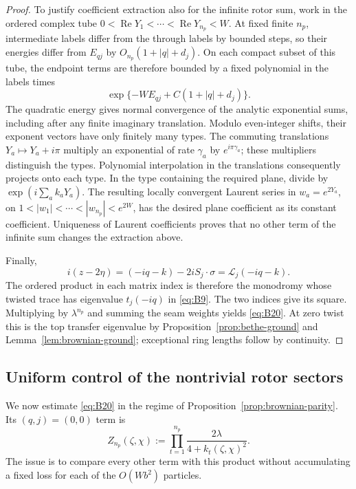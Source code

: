 \begin{proof}
To justify coefficient extraction also for the infinite rotor sum,
work in the ordered complex tube
$0<\operatorname{Re}Y_1<\cdots<\operatorname{Re}Y_{n_p}<W$.
At fixed finite $n_p$, intermediate labels differ from the through
labels by bounded steps, so their energies differ from $E_{qj}$ by
$O_{n_p}(1+|q|+d_j)$.  On each compact subset of this tube, the
endpoint terms are therefore bounded by a fixed polynomial in the
labels times
\[
 \exp\{-WE_{qj}+C(1+|q|+d_j)\}.
\]
The quadratic energy gives normal convergence of the analytic
exponential sums, including after any finite imaginary translation.
Modulo even-integer shifts, their exponent vectors have only finitely
many types.  The commuting translations $Y_a\mapsto Y_a+i\pi$
multiply an exponential of rate $\gamma_a$ by $e^{i\pi\gamma_a}$;
these multipliers distinguish the types.  Polynomial interpolation in
the translations consequently projects onto each type.  In the type
containing the required plane, divide by $\exp(i\sum_a k_aY_a)$.
The resulting locally convergent Laurent series in $w_a=e^{2Y_a}$,
on $1<|w_1|<\cdots<|w_{n_p}|<e^{2W}$, has the desired plane
coefficient as its constant coefficient.  Uniqueness
of Laurent coefficients proves that no other term of the infinite
sum changes the extraction above.

Finally,
\[
 i(z-2\eta)=(-iq-k)-2iS_j\cdot\sigma
           =\mathcal L_j(-iq-k).
\]
The ordered product in each matrix index is therefore the monodromy
whose twisted trace has eigenvalue $t_j(-iq)$ in \eqref{eq:B9}.
The two indices give its square.  Multiplying by $\lambda^{n_p}$ and
summing the seam weights yields \eqref{eq:B20}.  At zero twist this is
the top transfer eigenvalue by Proposition~\ref{prop:bethe-ground} and
Lemma~\ref{lem:brownian-ground}; exceptional ring lengths follow by
continuity.
\end{proof}

\subsection{Uniform control of the nontrivial rotor sectors}
\label{subsec:bethe-winding}

We now estimate \eqref{eq:B20} in the regime of
Proposition~\ref{prop:brownian-parity}.  Its $(q,j)=(0,0)$ term is
\[
 Z_{n_p}(\zeta,\chi)
   :=\prod_{t=1}^{n_p}\frac{2\lambda}{4+k_t(\zeta,\chi)^2}.
\]
The issue is to compare every other term with this product without
accumulating a fixed loss for each of the $O(Wb^2)$ particles.

